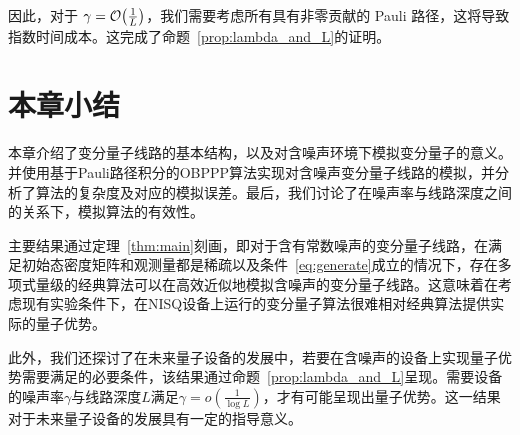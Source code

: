 因此，对于 $\gamma=\order{\frac{1}{L}}$，我们需要考虑所有具有非零贡献的 Pauli 路径，这将导致指数时间成本。这完成了命题~\ref{prop:lambda_and_L}的证明。


\section{本章小结}

本章介绍了变分量子线路的基本结构，以及对含噪声环境下模拟变分量子的意义。并使用基于Pauli路径积分的OBPPP算法实现对含噪声变分量子线路的模拟，并分析了算法的复杂度及对应的模拟误差。最后，我们讨论了在噪声率与线路深度之间的关系下，模拟算法的有效性。

主要结果通过定理~\ref{thm:main}刻画，即对于含有常数噪声的变分量子线路，在满足初始态密度矩阵和观测量都是稀疏以及条件~\ref{eq:generate}成立的情况下，存在多项式量级的经典算法可以在高效近似地模拟含噪声的变分量子线路。这意味着在考虑现有实验条件下，在NISQ设备上运行的变分量子算法很难相对经典算法提供实际的量子优势。

此外，我们还探讨了在未来量子设备的发展中，若要在含噪声的设备上实现量子优势需要满足的必要条件，该结果通过命题~\ref{prop:lambda_and_L}呈现。需要设备的噪声率$\gamma$与线路深度$L$满足$\gamma=o(\frac{1}{\log L})$，才有可能呈现出量子优势。这一结果对于未来量子设备的发展具有一定的指导意义。